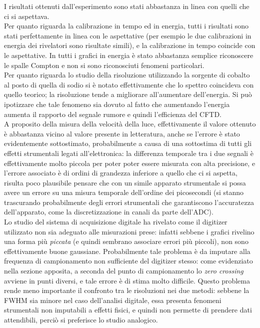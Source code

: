 I risultati ottenuti dall'esperimento sono stati abbastanza in linea con quelli che ci si aspettava.\\

Per quanto riguarda la calibrazione in tempo ed in energia, tutti i risultati sono stati perfettamente in linea con le aspettative (per esempio le due calibrazioni in energia
dei rivelatori sono risultate simili), e la calibrazione in tempo coincide con le aspettative. In tutti i grafici in energia è stato abbastanza semplice riconoscere le spalle
Compton e non si sono riconosciuti fenomeni particolari.\\

Per quanto riguarda lo studio della risoluzione utilizzando la sorgente di cobalto al posto di quella di sodio si è notato effettivamente che lo spettro coincideva con
quello teorico; la risoluzione tende a migliorare all'aumentare dell'energia. Si può ipotizzare che tale fenomeno sia dovuto al fatto che aumentando l'energia aumenta il rapporto del segnale rumore e quindi l'efficienza del CFTD.\\

A proposito della misura della velocità della luce, effettivamente il valore ottenuto è abbastanza vicino al valore presente in letteratura, anche se l'errore è stato
evidentemente sottostimato, probabilmente a causa di una sottostima di tutti gli effetti strumentali legati all'elettronica: la differenza temporale
tra i due segnali è effettivamente molto piccola per poter poter essere misurata con alta precisione, e l'errore associato è di ordini di grandezza inferiore a quello che
ci si aspetta, risulta poco plausibile pensare che con un simile apparato strumentale si possa avere un errore su una misura temporale dell'ordine dei picosecondi (si stanno trascurando probabilmente degli errori strumentali che garantiscono l'accuratezza dell'apparato, come la discretizzazione in canali da parte dell'ADC).\\

Lo studio del sistema di acquisizione digitale ha rivelato come il digitizer utilizzato non sia adeguato alle misurazioni prese: infatti sebbene i grafici rivelino una
forma più \textit{piccata} (e quindi sembrano associare errori più piccoli), non sono effettivamente buone gaussiane. Probabilmente tale problema è da imputare alla frequenza di
campionamento non sufficiente del digitizer stesso: come evidenziato nella sezione apposita, a seconda del punto di campionamento lo \textit{zero crossing} avviene in
punti diversi, e tale errore è di stima molto difficile. Questo problema rende meno importante il confronto tra le risoluzioni nei due metodi: sebbene la FWHM sia minore
nel caso dell'analisi digitale, essa presenta fenomeni strumentali non imputabili a effetti fisici, e quindi non permette di prendere dati attendibili, perciò si preferisce
lo studio analogico.

